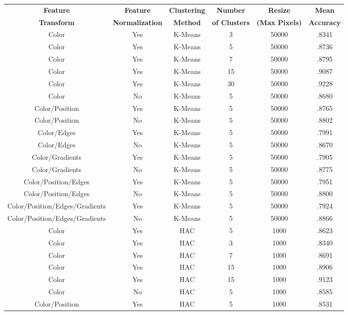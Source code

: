 \documentclass[12pt]{article}
\begin{document}
\begin{table}[H]
	\begin{adjustbox}{width=\columnwidth,center}
		\begin{tabular}{c c c c c c}
			\hline
			\textbf{Feature} & \textbf{Feature} & \textbf{Clustering} & \textbf{Number} & \textbf{Resize} & \textbf{Mean} \\
			\textbf{Transform} & \textbf{Normalization} & \textbf{Method} & \textbf{of Clusters} & \textbf{(Max Pixels)} & \textbf{Accuracy} \\
			\hline
			Color & Yes & K-Means & 3 & 50000 & .8341 \\
			Color & Yes & K-Means & 5 & 50000 & .8736 \\
			Color & Yes & K-Means & 7 & 50000 & .8795 \\
			Color & Yes & K-Means & 15 & 50000 & .9087 \\
			Color & Yes & K-Means & 30 & 50000 & .9228 \\
			Color & No  & K-Means & 5 & 50000 & .8680 \\
			Color/Position & Yes & K-Means & 5 & 50000 & .8765 \\
			Color/Position & No & K-Means & 5 & 50000 & .8802 \\
			Color/Edges & Yes & K-Means & 5 & 50000 & .7991\\
			Color/Edges & No & K-Means & 5 & 50000 & .8670 \\
			Color/Gradients & Yes & K-Means & 5 & 50000 & .7905 \\
			Color/Gradients & No & K-Means & 5 & 50000 & .8775 \\
			Color/Position/Edges & Yes & K-Means & 5 & 50000 & .7951 \\
			Color/Position/Edges & No & K-Means & 5 & 50000 & .8800 \\
			Color/Position/Edges/Gradients & Yes & K-Means & 5 & 50000 & .7924 \\
			Color/Position/Edges/Gradients & No & K-Means & 5 & 50000 & .8866 \\
			Color & Yes & HAC & 5 & 1000 & .8623 \\
			Color & Yes & HAC & 3 & 1000 & .8340 \\
			Color & Yes & HAC & 7 & 1000 & .8691 \\
			Color & Yes & HAC & 15 & 1000 & .8906 \\
			Color & Yes & HAC & 15 & 1000 & .9123 \\
			Color & No & HAC & 5 & 1000 & .8585 \\
			Color/Position & Yes & HAC & 5 & 1000 & .8531 \\

\end{tabular}
\end{adjustbox}
\end{table}
\end{document}
